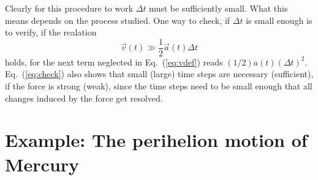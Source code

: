 \documentclass[12pt]{iopart}
\begin{document}
Clearly for this procedure to work $\Delta t$ must be sufficiently small. What this means depends on the process
studied. One way to check, if $\Delta t$ is small enough is to verify, if the realation
\begin{equation}
\vec v(t) \gg \frac12\vec a(t)\Delta t
\label{eq:check}
\end{equation}
holds, for the next term neglected in Eq.~(\ref{eq:vdef}) reads $(1/2)a(t)(\Delta t)^2$.  Eq.~({\ref{eq:check}})
also shows that small (large) time steps are necessary (sufficient), if the force is strong (weak), since
the time steps need to be small enough that all changes induced by the force get resolved.



\section{Example: The perihelion motion of Mercury}
\end{document}

